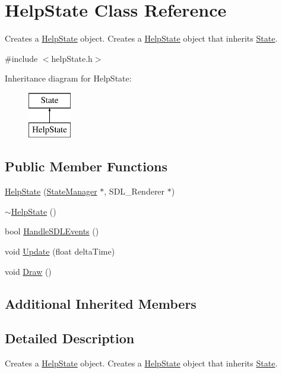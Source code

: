 \hypertarget{class_help_state}{\section{Help\+State Class Reference}
\label{class_help_state}
}


Creates a \hyperlink{class_help_state}{Help\+State} object. Creates a \hyperlink{class_help_state}{Help\+State} object that inherits \hyperlink{class_state}{State}.  




{\ttfamily \#include $<$help\+State.\+h$>$}

Inheritance diagram for Help\+State\+:\begin{figure}[H]
\begin{center}
\leavevmode
\includegraphics[height=2.000000cm]{class_help_state}
\end{center}
\end{figure}
\subsection*{Public Member Functions}
\begin{DoxyCompactItemize}
\item 
\hyperlink{class_help_state_a2c988d45d9f13b048fa8e44ad4c49571}{Help\+State} (\hyperlink{class_state_manager}{State\+Manager} $\ast$, S\+D\+L\+\_\+\+Renderer $\ast$)
\item 
\hyperlink{class_help_state_a9698cf3f338866bcbd05ec25fa20700c}{$\sim$\+Help\+State} ()
\item 
bool \hyperlink{class_help_state_a7149e10e0129b66a68290d259bce3015}{Handle\+S\+D\+L\+Events} ()
\item 
void \hyperlink{class_help_state_ac9a45859141cae970629aac1e7a69184}{Update} (float delta\+Time)
\item 
void \hyperlink{class_help_state_a281d12605303cc444e600b214a8d2161}{Draw} ()
\end{DoxyCompactItemize}
\subsection*{Additional Inherited Members}


\subsection{Detailed Description}
Creates a \hyperlink{class_help_state}{Help\+State} object. Creates a \hyperlink{class_help_state}{Help\+State} object that inherits \hyperlink{class_state}{State}. 

